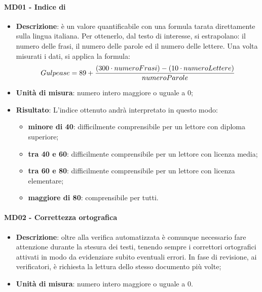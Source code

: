 		\paragraph{MD01 - Indice di }
		\begin{itemize}
			\item \textbf{Descrizione}: è un valore quantificabile con una formula tarata direttamente sulla lingua italiana. Per ottenerlo, dal testo di interesse, si estrapolano: il numero delle frasi, il numero delle parole ed il numero delle lettere.
			Una volta misurati i dati, si applica la formula:
			\begin{equation}\label{Formula per il calcolo dell'indice di Gulpease}
				Gulpease = 89 + {{(300 \cdot numeroFrasi)} - {(10 \cdot numeroLettere)} \over {numeroParole}}
			\end{equation}
			\item \textbf{Unità di misura}: numero intero maggiore o uguale a 0;
			\item \textbf{Risultato}: L'indice ottenuto andrà interpretato in questo modo:
			\begin{itemize}
				\item \textbf{minore di 40}: difficilmente comprensibile per un lettore con diploma superiore;
				\item \textbf{tra 40 e 60}: difficilmente comprensibile per un lettore con licenza media;
				\item \textbf{tra 60 e 80}: difficilmente comprensibile per un lettore con licenza elementare;
				\item \textbf{maggiore di 80}: comprensibile per tutti.
			\end{itemize}
		\end{itemize}
	
		\paragraph{MD02 - Correttezza ortografica} 
		\begin{itemize}
			\item \textbf{Descrizione}: oltre alla verifica automatizzata è comunque necessario fare attenzione durante la stesura dei testi, tenendo sempre i correttori ortografici attivati in modo da evidenziare subito eventuali errori. In fase di revisione, ai verificatori, è richiesta la lettura dello stesso documento più volte;
			\item \textbf{Unità di misura}: numero intero maggiore o uguale a 0.
		\end{itemize}
